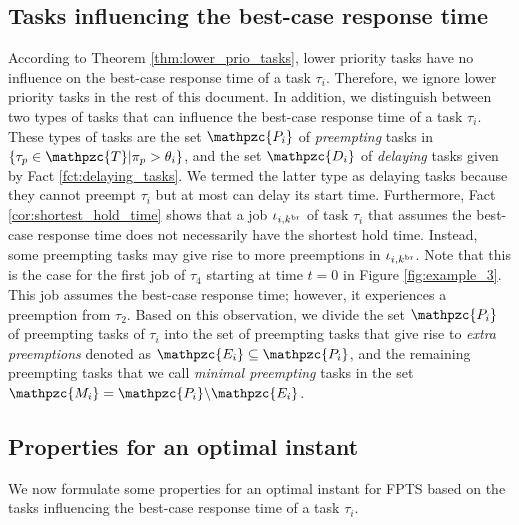 \subsection{Tasks influencing the best-case response time}


According to Theorem \ref{thm:lower_prio_tasks}, lower priority tasks have no influence on the best-case response time of a task $\tau_i$. Therefore, we ignore lower priority tasks in the rest of this document. In addition, we distinguish between two types of tasks that can influence the {best-case response time} of a task $\tau_i$. These types of tasks are the set $\mathpzc{P_i}$ of \textit{preempting} tasks in $\{\tau_p \in \mathpzc{T} | \pi_p>\theta_i\}$, and the set $\mathpzc{D_i}$ of \textit{delaying} tasks given by Fact \ref{fct:delaying_tasks}. We termed the latter type as {delaying} tasks because they cannot preempt $\tau_i$ but at most can delay its start time. Furthermore, Fact \ref{cor:shortest_hold_time} shows that a job $\iota_{i,k^{\rm{br}}}$ of task $\tau_i$ that assumes the best-case response time does not necessarily have the shortest hold time. Instead, some preempting tasks may give rise to more preemptions in $\iota_{i,k^{\rm{br}}}$. Note that this is the case for the first job of $\tau_4$ starting at time $t=0$ in Figure \ref{fig:example_3}. This job assumes the best-case response time; however, it experiences a preemption from $\tau_2$. Based on this observation, we divide the set $\mathpzc{P_i}$ of preempting tasks of $\tau_i$  into the set of preempting tasks that give rise to \textit{extra preemptions} denoted as $\mathpzc{E_i} \subseteq \mathpzc{P_i}$, and the remaining preempting tasks that we call \textit{minimal preempting} tasks in the set $\mathpzc{M_i}=\mathpzc{P_i}\backslash\mathpzc{E_i}$.

\subsection{Properties for an optimal instant} \label{sec:properties_optimal_instant}

We now formulate some properties for an optimal instant for FPTS based on the tasks influencing the best-case response time of a task $\tau_i$.

